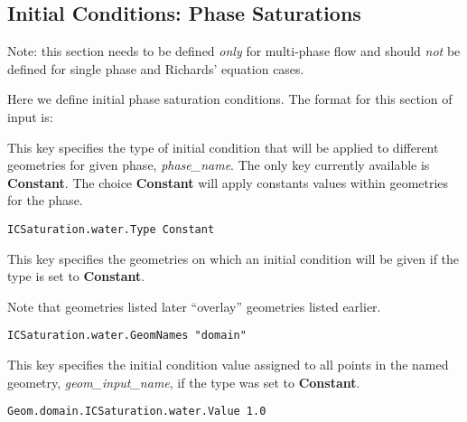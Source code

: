 
\subsection{Initial Conditions: Phase Saturations}
\label{Initial Conditions: Phase Saturations}

Note: this section needs to be defined {\em only} for multi-phase flow
and should {\em not} be defined for single phase and Richards' equation cases.

Here we define initial phase saturation conditions.
The format for this section of input is:

{
This key specifies the type of initial condition that will be applied
to different geometries for given phase, {\em phase\_name}.  The only
key currently available is {\bf Constant}.  The choice {\bf Constant}
will apply constants values within geometries for the phase. 
}
\begin{display}\begin{verbatim}
ICSaturation.water.Type Constant
\end{verbatim}\end{display}

{
This key specifies the geometries on which an initial condition will be
given if the type is set to {\bf Constant}.

Note that geometries listed later ``overlay'' geometries listed earlier.
}
\begin{display}\begin{verbatim}
ICSaturation.water.GeomNames "domain"
\end{verbatim}\end{display}

{
This key specifies the initial condition value assigned to all points in
the named geometry, {\em geom\_input\_name}, if the type was set to
{\bf Constant}.
}
\begin{display}\begin{verbatim}
Geom.domain.ICSaturation.water.Value 1.0
\end{verbatim}\end{display}

